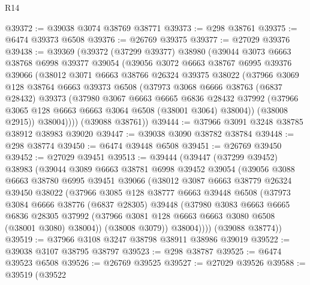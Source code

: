 \begin{lexlean}{R14}
\begin{coremodule}
@39372 := @39038 @3074 @38769 @38771
@39373 := @298 @38761
@39375 := @6474 @39373 @6508
@39376 := @26769 @39375
@39377 := @27029 @39376
@39438 := @39369
    (@39372
      (@37299 @39377)
      @38980
      (@39044
        @3073
        @6663
        @38768
        @6998
        @39377
        @39054
        (@39056
          @3072
          @6663
          @38767
          @6995
          @39376
          @39066
          (@38012
            @3071
            @6663
            @38766
            @26324
            @39375
            @38022
            (@37966
              @3069
              @128
              @38764
              @6663
              @39373
              @6508
              (@37973
                @3068
                @6666
                @38763
                (@6837 @28432)
                @39373
                (@37980
                  @3067
                  @6663
                  @6665
                  @6836
                  @28432
                  @37992
                  (@37966 @3065 @128 @6663 @6663 @3064 @6508 (@38001 @3064) @38004))
                (@38008 @2915))
              @38004))))
      (@39088 @38761))
@39444 := @37966 @3091 @3248 @38785 @38912 @38983 @39020
@39447 := @39038 @3090 @38782 @38784
@39448 := @298 @38774
@39450 := @6474 @39448 @6508
@39451 := @26769 @39450
@39452 := @27029 @39451
@39513 := @39444
    (@39447
      (@37299 @39452)
      @38983
      (@39044
        @3089
        @6663
        @38781
        @6998
        @39452
        @39054
        (@39056
          @3088
          @6663
          @38780
          @6995
          @39451
          @39066
          (@38012
            @3087
            @6663
            @38779
            @26324
            @39450
            @38022
            (@37966
              @3085
              @128
              @38777
              @6663
              @39448
              @6508
              (@37973
                @3084
                @6666
                @38776
                (@6837 @28305)
                @39448
                (@37980
                  @3083
                  @6663
                  @6665
                  @6836
                  @28305
                  @37992
                  (@37966 @3081 @128 @6663 @6663 @3080 @6508 (@38001 @3080) @38004))
                (@38008 @3079))
              @38004))))
      (@39088 @38774))
@39519 := @37966 @3108 @3247 @38798 @38911 @38986 @39019
@39522 := @39038 @3107 @38795 @38797
@39523 := @298 @38787
@39525 := @6474 @39523 @6508
@39526 := @26769 @39525
@39527 := @27029 @39526
@39588 := @39519
    (@39522

\end{coremodule}
\end{lexlean}
